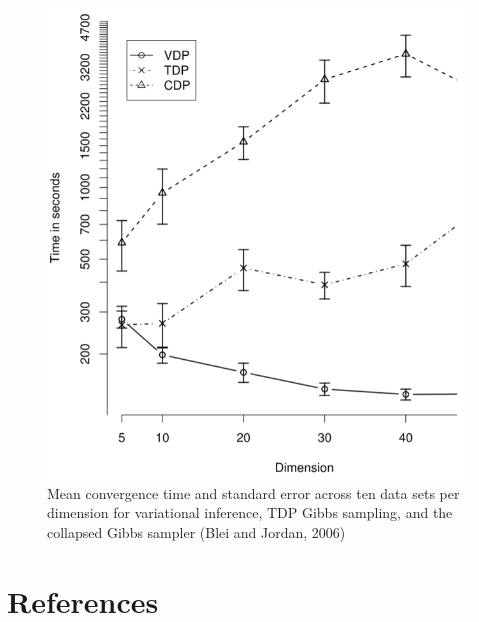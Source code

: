 \documentclass{article}
\begin{document}
\begin{figure}[!htp]
	\centering
	\includegraphics[scale=0.3]{figures/speed.png}
	\caption{Mean convergence time and standard error across ten data sets per dimension for variational inference, TDP Gibbs sampling, and the collapsed Gibbs sampler (Blei and Jordan, 2006)}
\end{figure}

\newpage

\section*{References}
\end{document}
